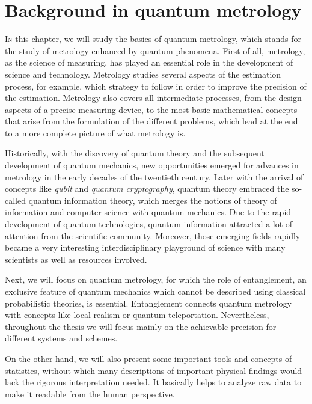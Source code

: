 \section{Background in quantum metrology}

\label{sec:bg}


\vspace{0pt}
\lettrine[lines=2, findent=3pt,nindent=0pt]{I}{n} this chapter, we will study the basics of quantum metrology, which stands for the study of metrology enhanced by quantum phenomena.
First of all, metrology, as the science of measuring, has played an essential role in the development of science and technology.
Metrology studies several aspects of the estimation process, for example, which strategy to follow in order to improve the precision of the estimation.
Metrology also covers all intermediate processes, from the design aspects of a precise measuring device, to the most basic mathematical concepts that arise from the formulation of the different problems, which lead at the end to a more complete picture of what metrology is.

Historically, with the discovery of quantum theory and the subsequent development of quantum mechanics, new opportunities emerged for advances in metrology in the early decades of the twentieth century.
Later with the arrival of concepts like \emph{qubit} and \emph{quantum cryptography}, quantum theory embraced the so-called quantum information theory, which merges the notions of theory of information and computer science with quantum mechanics.
Due to the rapid development of quantum technologies, quantum information attracted a lot of attention from the scientific community.
Moreover, those emerging fields rapidly became a very interesting interdisciplinary playground of science with many scientists as well as resources involved.

Next, we will focus on quantum metrology, for which the role of entanglement, an exclusive feature of quantum mechanics which cannot be described using classical probabilistic theories, is essential.
Entanglement connects quantum metrology with concepts like local realism or quantum teleportation.
Nevertheless, throughout the thesis we will focus mainly on the achievable precision for different systems and schemes.

On the other hand, we will also present some important tools and concepts of statistics, without which many descriptions of important physical findings would lack the rigorous interpretation needed.
It basically helps to analyze raw data to make it readable from the human perspective.

